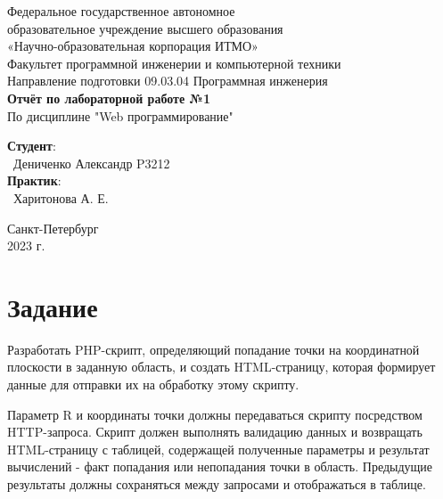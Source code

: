 \documentclass{article}
\begin{document}
\begin{center}
    \Large
    Федеральное государственное автономное \\
    образовательное учреждение высшего образования \\ 
    «Научно-образовательная корпорация ИТМО»\\
    \vspace{0.5cm}
    \large
    Факультет программной инженерии и компьютерной техники \\
    Направление подготовки 09.03.04 Программная инженерия \\
    \vspace{1cm}
    \Large
    \textbf{Отчёт по лабораторной работе №1} \\
    По дисциплине "Web программирование" \\
    \large
    \vspace{8cm}

    \begin{minipage}{.33\textwidth}
    \end{minipage}
    \hfill
    \begin{minipage}{.4\textwidth}
    
        \textbf{Студент}: \vspace{.1cm} \\
        \ Дениченко Александр P3212\\
        \textbf{Практик}:  \\
        \ Харитонова А. Е.
    \end{minipage}
    \vfill
Санкт-Петербург\\ 2023 г.
\end{center}

\newpage

\section{Задание}
Разработать PHP-скрипт, определяющий попадание точки на координатной плоскости в заданную область, и создать HTML-страницу, которая формирует данные для отправки их на обработку этому скрипту.




Параметр R и координаты точки должны передаваться скрипту посредством HTTP-запроса. Скрипт должен выполнять валидацию данных и возвращать HTML-страницу с таблицей, содержащей полученные параметры и результат вычислений - факт попадания или непопадания точки в область. Предыдущие результаты должны сохраняться между запросами и отображаться в таблице.
\end{document}
